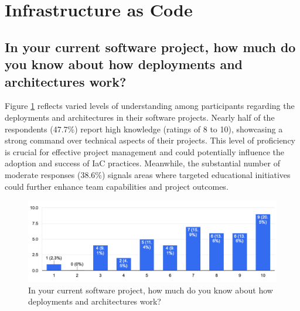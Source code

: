 \pagebreak


\section{Infrastructure as Code}

\subsection*{In your current software project, how much do you know about how deployments and architectures work?}
Figure \ref{fig:results:iac:1} reflects varied levels of understanding among participants regarding the deployments and architectures in their software projects. Nearly half of the respondents (47.7\%) report high knowledge (ratings of 8 to 10), showcasing a strong command over technical aspects of their projects. This level of proficiency is crucial for effective project management and could potentially influence the adoption and success of \ac{IaC} practices. Meanwhile, the substantial number of moderate responses (38.6\%) signals areas where targeted educational initiatives could further enhance team capabilities and project outcomes.

\begin{figure}[h!]
\centering
\includegraphics[width=\linewidth]{Images/Survey/iac_1.png}
\caption{In your current software project, how much do you know about how deployments and architectures work?}
\label{fig:results:iac:1}
\end{figure}

\pagebreak


